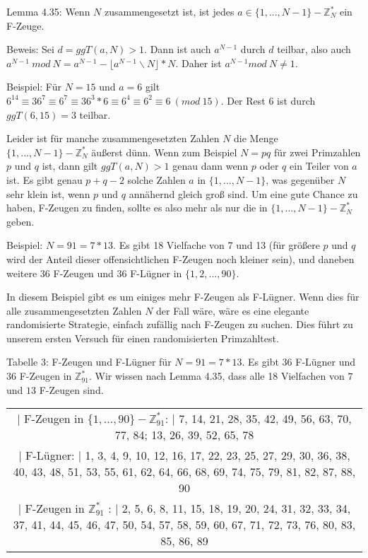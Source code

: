 \documentclass[a4paper]{article}
\begin{document}
\begin{multicols}{3}
        Lemma 4.35: Wenn $N$ zusammengesetzt ist, ist jedes $a\in\{1,...,N-1\}-\mathbb{Z}^*_N$ ein F-Zeuge.

        Beweis: Sei $d=ggT(a,N)>1$. Dann ist auch $a^{N-1}$ durch $d$ teilbar, also auch $a^{N-1}\ mod\ N=a^{N-1}- \lfloor a^{N-1}\backslash N\rfloor *N$. Daher ist $a^{N-1} mod\ N\not= 1$.

        Beispiel: Für $N=15$ und $a=6$ gilt $6^{14}\equiv 36^7\equiv 6^7 \equiv 36^3 * 6 \equiv 6^4 \equiv 6^2 \equiv 6\ (mod\ 15)$. Der Rest $6$ ist durch $ggT(6,15) = 3$ teilbar.

        Leider ist für manche zusammengesetzten Zahlen $N$ die Menge $\{1 ,...,N-1\}-\mathbb{Z}^*_N$ äußerst dünn. Wenn zum Beispiel $N=pq$ für zwei Primzahlen $p$ und $q$ ist, dann gilt $ggT(a,N)> 1$ genau dann wenn $p$ oder $q$ ein Teiler von $a$ ist. Es gibt genau $p+q-2$ solche Zahlen $a$ in $\{ 1 ,...,N-1\}$, was gegenüber $N$ sehr klein ist, wenn $p$ und $q$ annähernd gleich groß sind. Um eine gute Chance zu haben, F-Zeugen zu finden, sollte es also mehr als nur die in $\{1 ,...,N-1\}-\mathbb{Z}^*_N$ geben.

        Beispiel: $N=91 = 7*13$. Es gibt 18 Vielfache von 7 und 13 (für größere $p$ und $q$ wird der Anteil dieser offensichtlichen F-Zeugen noch kleiner sein), und daneben weitere $36$ F-Zeugen und $36$ F-Lügner in $\{1 , 2 ,..., 90\}$.

        In diesem Beispiel gibt es um einiges mehr F-Zeugen als F-Lügner. Wenn dies für alle zusammengesetzten Zahlen $N$ der Fall wäre, wäre es eine elegante randomisierte Strategie, einfach zufällig nach F-Zeugen zu suchen. Dies führt zu unserem ersten Versuch für einen randomisierten Primzahltest.

        Tabelle 3: F-Zeugen und F-Lügner für $N=91= 7*13$. Es gibt $36$ F-Lügner und $36$ F-Zeugen in $\mathbb{Z}^*_{91}$. Wir wissen nach Lemma 4.35, dass alle 18 Vielfachen von $7$ und $13$ F-Zeugen sind.
        \begin{tabular}{c}
            | F-Zeugen in $\{ 1 ,..., 90\}-\mathbb{Z}^*_{91}$: | 7, 14, 21, 28, 35, 42, 49, 56, 63, 70, 77, 84; 13, 26, 39, 52, 65, 78                                                  \\
            | F-Lügner:                    | 1, 3, 4, 9, 10, 12, 16, 17, 22, 23, 25, 27, 29, 30, 36, 38, 40, 43, 48, 51, 53, 55, 61, 62, 64, 66, 68, 69, 74, 75, 79, 81, 82, 87, 88, 90 \\
            | F-Zeugen in $\mathbb{Z}^*_{91}$ :        | 2, 5, 6, 8, 11, 15, 18, 19, 20, 24, 31, 32, 33, 34, 37, 41, 44, 45, 46, 47, 50, 54, 57, 58, 59, 60, 67, 71, 72, 73, 76, 80, 83, 85, 86, 89
        \end{tabular}


\end{multicols}
\end{document}
